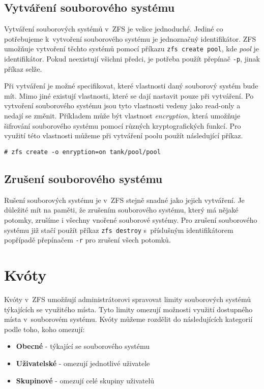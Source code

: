 \subsection{Vytváření souborového systému}
\label{createfs}
Vytváření souborových systémů v~ZFS je velice jednoduché. Jediné co potřebujeme k~vytvoření souborového systému je jednoznačný identifikátor. ZFS umožňuje vytvoření těchto systémů pomocí příkazu \verb|zfs create pool|, kde \emph{pool} je identifikátor. Pokud neexistují všichni předci, je potřeba použít přepínač \verb|-p|, jinak příkaz selže.

Při vytváření je možné specifikovat, které vlastnosti daný souborový systém bude mít. Mimo jiné existují vlastnosti, které se dají nastavit pouze při vytváření. Po vytvoření souborového systému jsou tyto vlastnosti vedeny jako read-only a nedají se změnit. Příkladem může být vlastnost \emph{encryption}, která umožňuje šifrování souborového systému pomocí různých kryptografických funkcí. Pro využití této vlastnosti můžeme při vytváření poolu použít následující příkaz.
\begin{verbatim}
# zfs create -o enryption=on tank/pool/pool
\end{verbatim}
\subsection{Zrušení souborového systému}
Rušení souborových systému je v~ZFS stejně snadné jako jejich vytváření. Je důležité mít na paměti, že zrušením souborového systému, který má nějaké potomky, zrušíme i všechny vnořené souborové systémy. Pro zrušení souborového systému již stačí použít příkaz \verb|zfs destroy| s~příslušným identifikátorem popřípadě přepínačem \verb|-r| pro zrušení všech potomků.
\section{Kvóty}
\label{quota}

Kvóty v~ZFS umožňují administrátorovi spravovat limity souborových systémů týkajících se využitého místa. Tyto limity omezují možnosti využití dostupného místa v~souborovém systému. Kvóty můžeme rozdělit do následujících kategorií podle toho, koho omezují:
\begin{itemize}
  \item \textbf{Obecné} - týkající se souborového systému
  \item \textbf{Uživatelské} - omezují jednotlivé uživatele
  \item \textbf{Skupinové} - omezují celé skupiny uživatelů
\end{itemize}

